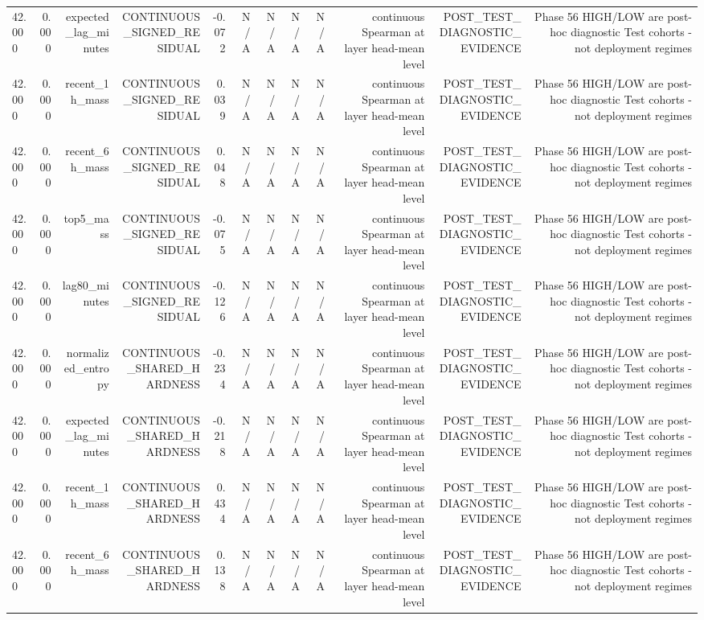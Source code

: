 \begin{table}[h!]
\begin{tabular}{lrrrrrrrrrrr}
42.000 & 0.000 & expected\_lag\_minutes & CONTINUOUS\_SIGNED\_RESIDUAL & -0.072 & N/A & N/A & N/A & N/A & continuous Spearman at layer head-mean level & POST\_TEST\_DIAGNOSTIC\_EVIDENCE & Phase 56 HIGH/LOW are post-hoc diagnostic Test cohorts - not deployment regimes \\
42.000 & 0.000 & recent\_1h\_mass & CONTINUOUS\_SIGNED\_RESIDUAL & 0.039 & N/A & N/A & N/A & N/A & continuous Spearman at layer head-mean level & POST\_TEST\_DIAGNOSTIC\_EVIDENCE & Phase 56 HIGH/LOW are post-hoc diagnostic Test cohorts - not deployment regimes \\
42.000 & 0.000 & recent\_6h\_mass & CONTINUOUS\_SIGNED\_RESIDUAL & 0.048 & N/A & N/A & N/A & N/A & continuous Spearman at layer head-mean level & POST\_TEST\_DIAGNOSTIC\_EVIDENCE & Phase 56 HIGH/LOW are post-hoc diagnostic Test cohorts - not deployment regimes \\
42.000 & 0.000 & top5\_mass & CONTINUOUS\_SIGNED\_RESIDUAL & -0.075 & N/A & N/A & N/A & N/A & continuous Spearman at layer head-mean level & POST\_TEST\_DIAGNOSTIC\_EVIDENCE & Phase 56 HIGH/LOW are post-hoc diagnostic Test cohorts - not deployment regimes \\
42.000 & 0.000 & lag80\_minutes & CONTINUOUS\_SIGNED\_RESIDUAL & -0.126 & N/A & N/A & N/A & N/A & continuous Spearman at layer head-mean level & POST\_TEST\_DIAGNOSTIC\_EVIDENCE & Phase 56 HIGH/LOW are post-hoc diagnostic Test cohorts - not deployment regimes \\
42.000 & 0.000 & normalized\_entropy & CONTINUOUS\_SHARED\_HARDNESS & -0.234 & N/A & N/A & N/A & N/A & continuous Spearman at layer head-mean level & POST\_TEST\_DIAGNOSTIC\_EVIDENCE & Phase 56 HIGH/LOW are post-hoc diagnostic Test cohorts - not deployment regimes \\
42.000 & 0.000 & expected\_lag\_minutes & CONTINUOUS\_SHARED\_HARDNESS & -0.218 & N/A & N/A & N/A & N/A & continuous Spearman at layer head-mean level & POST\_TEST\_DIAGNOSTIC\_EVIDENCE & Phase 56 HIGH/LOW are post-hoc diagnostic Test cohorts - not deployment regimes \\
42.000 & 0.000 & recent\_1h\_mass & CONTINUOUS\_SHARED\_HARDNESS & 0.434 & N/A & N/A & N/A & N/A & continuous Spearman at layer head-mean level & POST\_TEST\_DIAGNOSTIC\_EVIDENCE & Phase 56 HIGH/LOW are post-hoc diagnostic Test cohorts - not deployment regimes \\
42.000 & 0.000 & recent\_6h\_mass & CONTINUOUS\_SHARED\_HARDNESS & 0.138 & N/A & N/A & N/A & N/A & continuous Spearman at layer head-mean level & POST\_TEST\_DIAGNOSTIC\_EVIDENCE & Phase 56 HIGH/LOW are post-hoc diagnostic Test cohorts - not deployment regimes \\

\end{tabular}
\end{table}
